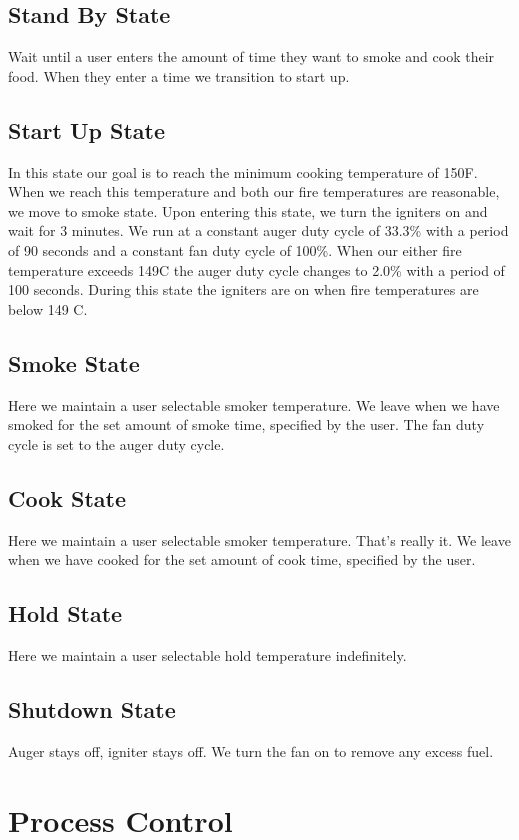 \documentclass{article}
\begin{document}
\subsection{Stand By State}
Wait until a user enters the amount of time they want to smoke and cook their food. When they enter a time we transition to start up.
\subsection{Start Up State}
In this state our goal is to reach the minimum cooking temperature of 150\degree F. When we reach this temperature and both our fire temperatures are reasonable, we move to smoke state. Upon entering this state, we turn the igniters on and wait for 3 minutes. We run at a constant auger duty cycle of 33.3\% with a period of 90 seconds and a constant fan duty cycle of 100\%. When our either fire temperature exceeds 149\degree C the auger duty cycle changes to 2.0\% with a period of 100 seconds. During this state the igniters are on when fire temperatures are below 149 \degree C.  
\subsection{Smoke State}
Here we maintain a user selectable smoker temperature. We leave when we have smoked for the set amount of smoke time, specified by the user. The fan duty cycle is set to the auger duty cycle.
\subsection*{Cook State}
Here we maintain a user selectable smoker temperature. That's really it. We leave when we have cooked for the set amount of cook time, specified by the user.
\subsection{Hold State}
Here we maintain a user selectable hold temperature indefinitely.
\subsection{Shutdown State}
Auger stays off, igniter stays off. We turn the fan on to remove any excess fuel.
\section{Process Control}
\end{document}
